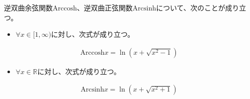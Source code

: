 \documentclass[dvipdfmx]{jsarticle}
\begin{document}
\begin{thm}\label{4.3.1.61}
逆双曲余弦関数$\mathrm{Arccosh}$、逆双曲正弦関数$\mathrm{Arcsinh}$について、次のことが成り立つ。
\begin{itemize}
\item
  $\forall x \in [ 1,\infty)$に対し、次式が成り立つ。
\end{itemize}
\begin{align*}
{\mathrm{Arccosh}}x = \ln\left( x + \sqrt{x^{2} - 1} \right)
\end{align*}
\begin{itemize}
\item
  $\forall x \in \mathbb{R}$に対し、次式が成り立つ。
\end{itemize}
\begin{align*}
{\mathrm{Arcsinh}}x = \ln\left( x + \sqrt{x^{2} + 1} \right)
\end{align*}
\end{thm}
\end{document}
